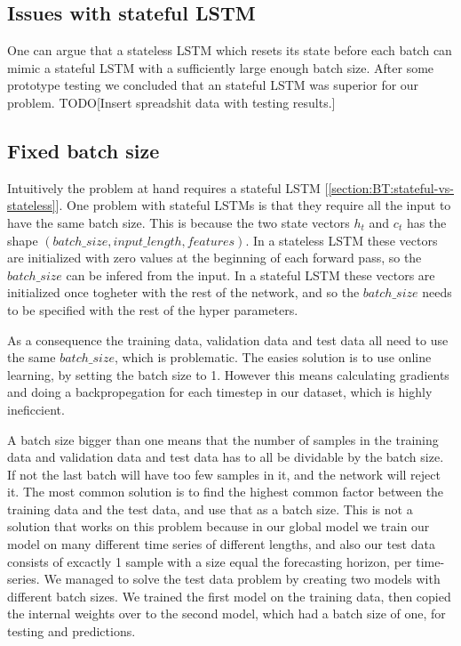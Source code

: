 
\subsection{Issues with stateful LSTM}
\label{section:Method:issues-with-stateful-lstm}
One can argue that a stateless LSTM which resets its state before each batch
can mimic a stateful LSTM with a sufficiently large enough batch size.
After some prototype testing we concluded that an stateful LSTM
was superior for our problem.
TODO[Insert spreadshit data with testing results.]

\subsection{Fixed batch size}
\label{section:Method:issues-lstm:fixed-batch-size}
Intuitively the problem at hand requires a stateful LSTM [\cref{section:BT:stateful-vs-stateless}].
One problem with stateful LSTMs is that they require all the input to have the same
batch size.
This is because the two state vectors $h_t$ and $c_t$ has the shape
$(batch\_size, input\_length, features)$. In a stateless LSTM these
vectors are initialized with zero values at the beginning of each forward pass,
so the $batch\_size$ can be infered from the input.
In a stateful LSTM these vectors are initialized once togheter with the rest
of the network, and so the $batch\_size$ needs to be specified with
the rest of the hyper parameters.

As a consequence the training data, validation data and test data all
need to use the same $batch\_size$, which is problematic.
The easies solution is to use online learning, by setting the batch size to 1.
However this means calculating gradients and doing a backpropegation for each
timestep in our dataset, which is highly ineficcient.

A batch size bigger than one means that the number of samples in
the training data and validation data and test data has to all be
dividable by the batch size. If not the last batch will have too few samples in it,
and the network will reject it.
The most common solution is to find the highest common factor
between the training data and the test data, and use that as a batch size.
This is not a solution that works on this problem because in our global model
we train our model on many different time series of different lengths,
and
also our test data consists of excactly 1 sample with a size equal the
forecasting horizon, per time-series.
We managed to solve the test data problem by creating two models with
different batch sizes. We trained the first model on the training data,
then copied the internal weights over to the second model, which had a
batch size of one, for testing and
predictions.


